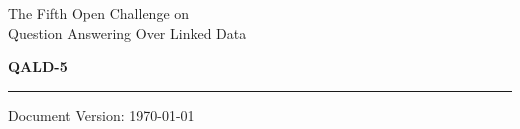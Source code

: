 \documentclass[a4paper]{article}
\begin{document}
\thispagestyle{empty}

%

\begin{center}

{\sc\large The Fifth Open Challenge on\\ Question Answering Over Linked Data} 

\vspace{.3cm}

{\huge\bf QALD-5}
\end{center}

\hrule

\vspace{.4cm}

{\sc Document Version:} \today

\vspace{.4cm}
\end{document}
